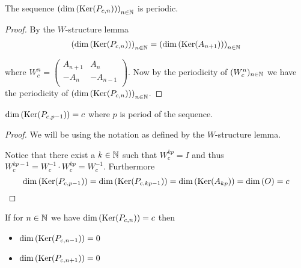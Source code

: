 \begin{proposition}
  The sequence $\left(\dim\left(\operatorname{Ker}(P_{c,n})\right)\right)_{n\in\mathbb{N}}$
  is periodic.
\end{proposition}

\begin{proof}
  By the $W$-structure lemma
  \[
  \left(\dim\left(\operatorname{Ker}(P_{c,n})\right)\right)_{n\in\mathbb{N}} 
  = 
  \left(\dim\left(\operatorname{Ker}(A_{n+1})\right)\right)_{n\in\mathbb{N}}
  \]

  where $W_{c}^{n}=\left(\begin{smallmatrix} A_{n+1} & A_{n}  \\ -A_{n} & -A_{n-1} \\\end{smallmatrix}\right)$.
  Now  by the periodicity of $(W_{c}^{n})_{n\in\mathbb{N}}$ we have the
  periodicity of
  $\left(\dim\left(\operatorname{Ker}(P_{c,n})\right)\right)_{n\in\mathbb{N}}$.
\end{proof}

\begin{lemma}
  $\dim\left(\operatorname{Ker}(P_{c,p-1})\right) = c$ where $p$ is period of the sequence. 
\end{lemma}

\begin{proof}
  We will be using the notation as defined by the $W$-structure lemma.

  Notice that there exist a $k\in\mathbb{N}$ such that $W_{c}^{kp} = I$ and
  thus $W_{c}^{kp-1} = W_{c}^{-1} \cdot W_{c}^{kp} = W_{c}^{-1}$. 
  Furthermore
  \[
  \dim\left(\operatorname{Ker}(P_{c,p-1})\right)
  =
  \dim\left(\operatorname{Ker}(P_{c,kp-1})\right)
  =
  \dim\left(\operatorname{Ker}(A_{kp})\right) = \dim\left(O\right)
  = c
  \]
\end{proof}

\begin{lemma}
  If for $n\in\mathbb{N}$ we have $\dim\left(\operatorname{Ker}(P_{c,n})\right) = c$ then
  \begin{itemize}
    \item $\dim\left(\operatorname{Ker}(P_{c,n-1})\right) = 0$
    \item $\dim\left(\operatorname{Ker}(P_{c,n+1})\right) = 0$
  \end{itemize}
\end{lemma}

